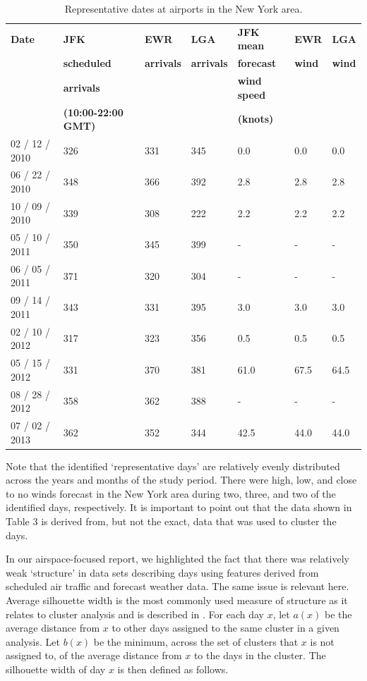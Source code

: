 \documentclass[11pt]{scrartcl}
\begin{document}
\begin{table}[h]
\caption{Representative dates at airports in the New York area.}
\begin{center}
\begin{tabular}{|l|l|l|l|l|l|l|}
\hline
{\bf Date} & {\bf JFK} & {\bf EWR} & {\bf LGA} & {\bf JFK mean} & {\bf EWR} & {\bf LGA} \\
& {\bf scheduled} & {\bf arrivals} & {\bf arrivals} & {\bf forecast} & {\bf wind} & {\bf wind}\\
& {\bf arrivals} & & &  {\bf wind speed} & & \\
& {\bf (10:00-22:00 GMT)} & & & {\bf (knots)} & & \\
\hline
02 / 12 / 2010 & 326 & 331 & 345 & 0.0 & 0.0 & 0.0\\
\hline
06 / 22 / 2010 & 348 & 366 & 392 & 2.8 & 2.8 & 2.8\\
\hline
10 / 09 / 2010 & 339 & 308 & 222 & 2.2 & 2.2 & 2.2\\
\hline
05 / 10 / 2011 & 350 & 345 & 399 & - & - & -\\
\hline
06 / 05 / 2011 & 371 & 320 & 304 & - & - & -\\
\hline
09 / 14 / 2011 & 343 & 331 & 395 & 3.0 & 3.0 & 3.0\\
\hline
02 / 10 / 2012 & 317 & 323 & 356 & 0.5 & 0.5 & 0.5\\
\hline
05 / 15 / 2012 & 331 & 370 & 381 & 61.0 & 67.5 & 64.5\\
\hline
08 / 28 / 2012 & 358 & 362 & 388 & - & - & -\\
\hline
07 / 02 / 2013 & 362 & 352 & 344 & 42.5 & 44.0 & 44.0\\
\hline
\end{tabular}
\end{center}
\label{default}
\end{table}

Note that the identified `representative days' are relatively evenly distributed across the years and months of the study period.  There were high, low, and close to no winds forecast in the New York area during two, three, and two of the identified days, respectively.  It is important to point out that the data shown in Table 3 is derived from, but not the exact, data that was used to cluster the days.

In our airspace-focused report, we highlighted the fact that there was relatively weak `structure' in data sets describing days using features derived from scheduled air traffic and forecast weather data.  The same issue is relevant here.  Average silhouette width is the most commonly used measure of structure as it relates to cluster analysis and is described in \cite{silhouette}.  For each day $x$, let $a(x)$ be the average distance from $x$ to other days assigned to the same cluster in a given analysis.  Let $b(x)$ be the minimum, across the set of clusters that $x$ is not assigned to, of the average distance from $x$ to the days in the cluster.  The silhouette width of day $x$ is then defined as follows.\\
\end{document}
